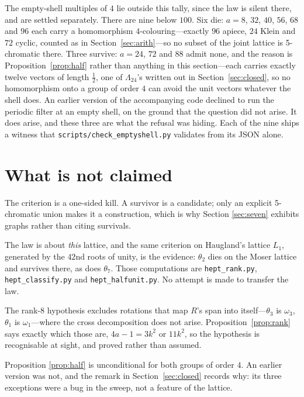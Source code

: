 \documentclass[11pt,reqno]{amsart}
\theoremstyle{plain}
\theoremstyle{definition}
\newcommand{\Lat}{R}
\newcommand{\Lam}{\Lambda}
\begin{document}
The empty-shell multiples of $4$ lie outside this tally, since the law is silent
there, and are settled separately. There are nine below $100$. Six die: $a = 8$,
$32$, $40$, $56$, $68$ and $96$ each carry a homomorphism $4$-colouring---exactly
$96$ apiece, $24$ Klein and $72$ cyclic, counted as in
Section~\ref{sec:arith}---so no subset of the joint lattice is 5-chromatic there.
Three survive: $a = 24$, $72$ and $88$ admit none, and the reason is
Proposition~\ref{prop:half} rather than anything in this section---each carries
exactly twelve vectors of length $\tfrac12$, one of $\Lam_{24}$'s written out in
Section~\ref{sec:closed}, so no homomorphism onto a group of order $4$ can avoid
the unit vectors whatever the shell does. An earlier version of the accompanying
code declined to run the periodic filter at an empty shell, on the ground that
the question did not arise. It does arise, and these three are what the refusal
was hiding. Each of the nine ships a witness that
\texttt{scripts/check\_emptyshell.py} validates from its JSON alone.

\section{What is not claimed}\label{sec:notclaimed}

The criterion is a one-sided kill. A survivor is a candidate; only an explicit
5-chromatic union makes it a construction, which is why Section \ref{sec:seven}
exhibits graphs rather than citing survivals.

The law is about \emph{this} lattice, and the same criterion on Haugland's
lattice $L_1$, generated by the $42$nd roots of unity, is the evidence:
$\theta_2$ dies on the Moser lattice and survives there, as does $\theta_7$.
Those computations are \texttt{hept\_rank.py}, \texttt{hept\_classify.py} and
\texttt{hept\_halfunit.py}. No attempt is made to transfer the law.

The rank-$8$ hypothesis excludes rotations that map $\Lat$'s span into
itself---$\theta_3$ is $\omega_3$, $\theta_1$ is $\omega_1$---where the cross
decomposition does not arise. Proposition~\ref{prop:rank} says exactly which
those are, $4a-1 = 3k^2$ or $11k^2$, so the hypothesis is recognisable at sight,
and proved rather than assumed.

Proposition \ref{prop:half} is unconditional for both groups of order $4$. An
earlier version was not, and the remark in Section~\ref{sec:closed} records why:
its three exceptions were a bug in the sweep, not a feature of the lattice.
\end{document}
